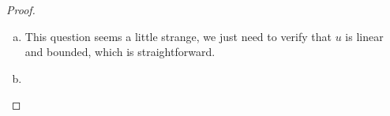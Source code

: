 \begin{proof}
  \begin{enumerate}[(a)]
    \item This question seems a little strange, we just need to verify that
      $u$ is linear and bounded, which is straightforward.
    \item 
  \end{enumerate}
\end{proof}
